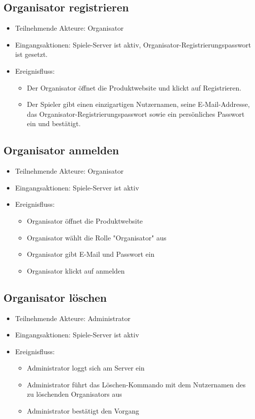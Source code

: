 \documentclass[a4paper]{scrreprt}
\begin{document}
    \subsection{Organisator registrieren}
    \begin{itemize}
        \item Teilnehmende Akteure: Organisator
        \item Eingangsaktionen: Spiele-Server ist aktiv, Organisator-Registrierungspasswort ist gesetzt.
        \item Ereignisfluss:
        \begin{itemize}
            \item Der Organisator öffnet die Produktwebsite und klickt auf Registrieren.
            \item Der Spieler gibt einen einzigartigen Nutzernamen, seine E-Mail-Addresse, das Organisator-Registrierungspasswort sowie ein persönliches Passwort ein und bestätigt.
        \end{itemize}
    \end{itemize}

    \subsection{Organisator anmelden}
    \begin{itemize}
        \item Teilnehmende Akteure: Organisator
        \item Eingangsaktionen: Spiele-Server ist aktiv
        \item Ereignisfluss:
        \begin{itemize}
            \item Organisator öffnet die Produktwebsite
            \item Organisator wählt die Rolle "Organisator" aus
            \item Organisator gibt E-Mail und Passwort ein
            \item Organisator klickt auf anmelden
        \end{itemize}
    \end{itemize}

    \subsection{Organisator löschen}
    \begin{itemize}
        \item Teilnehmende Akteure: Administrator
        \item Eingangsaktionen: Spiele-Server ist aktiv
        \item Ereignisfluss:
        \begin{itemize}
            \item Administrator loggt sich am Server ein
            \item Administrator führt das Löschen-Kommando mit dem Nutzernamen des zu löschenden Organisators aus
            \item Administrator bestätigt den Vorgang
        \end{itemize}
    \end{itemize}
\end{document}
